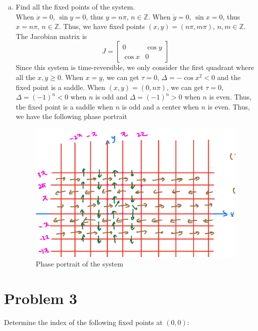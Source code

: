 \documentclass[12pt]{exam}
\begin{document}
\begin{enumerate}[(a)]
	\item Find all the fixed points of the system.\\
		When $\dot{x} =0$, $\sin y =0$, thus $y = n\pi$, $n\in \mathbb{Z}$. When $\dot{y}=0$, $\sin x =0$, thus $x = n\pi$, $n\in \mathbb{Z}$. Thus, we have fixed points $(x, y) = (n\pi, m\pi)$, $n, m\in \mathbb{Z}$. The Jacobian matrix is
		\[ J = \begin{bmatrix} 0 & \cos y \\ \cos x & 0 \end{bmatrix} \]
		Since this system is time-reversible, we only consider the first quadrant where all the $x,y \geq 0$. When $x=y$, we can get $\tau = 0$, $\Delta = - \cos x^2 <0$ and the fixed point is a saddle. When $(x,y) = (0, n\pi)$, we can get $\tau =0$, $\Delta = (-1)^n <0$ when $n$ is odd and $\Delta = (-1)^n >0$ when $n$ is even. Thus, the fixed point is a saddle when $n$ is odd and a center when $n$ is even. Thus, we have the following phase portrait
		\begin{figure}[H]
			\centering
			\includegraphics[width=0.7\linewidth]{2b.jpeg}
			\caption{Phase portrait of the system}
		\end{figure}

\end{enumerate}






\section*{Problem 3}
Determine the index of the following fixed points at $(0, 0)$:
\end{document}
